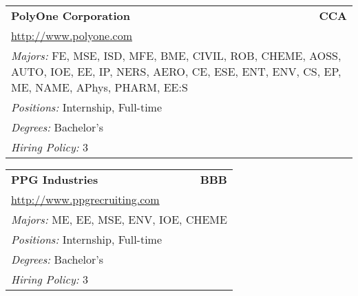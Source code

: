 \documentclass[twoside]{article}
\begin{document}
\begin{center}
\begin{multicols}{3}
\begin{FlushLeft}
\begin{minipage}{.9\columnwidth}
\end{minipage}
 
\begin{minipage}{.9\columnwidth}\begin{tabularx}{.95\columnwidth}{Xr}
                 {\Large\bf PolyOne Corporation} & {\Large\bf CCA}\\
    \multicolumn{2}{p{.95\columnwidth}}{\url{http://www.polyone.com}}\\
    \multicolumn{2}{p{.95\columnwidth}}{\emph{Majors:} FE, MSE, ISD, MFE, BME, CIVIL, ROB, CHEME, AOSS, AUTO, IOE, EE, IP, NERS, AERO, CE, ESE, ENT, ENV, CS, EP, ME, NAME, APhys, PHARM, EE:S}\\
    \multicolumn{2}{p{.95\columnwidth}}{\emph{Positions:} Internship, Full-time}\\
    \multicolumn{2}{p{.95\columnwidth}}{\emph{Degrees:} Bachelor's}\\
    \multicolumn{2}{p{.95\columnwidth}}{\emph{Hiring Policy:} 3}\\
    \end{tabularx}
    
\end{minipage}
 
\begin{minipage}{.9\columnwidth}\begin{tabularx}{.95\columnwidth}{Xr}
                 {\Large\bf PPG Industries} & {\Large\bf BBB}\\
    \multicolumn{2}{p{.95\columnwidth}}{\url{http://www.ppgrecruiting.com}}\\
    \multicolumn{2}{p{.95\columnwidth}}{\emph{Majors:} ME, EE, MSE, ENV, IOE, CHEME}\\
    \multicolumn{2}{p{.95\columnwidth}}{\emph{Positions:} Internship, Full-time}\\
    \multicolumn{2}{p{.95\columnwidth}}{\emph{Degrees:} Bachelor's}\\
    \multicolumn{2}{p{.95\columnwidth}}{\emph{Hiring Policy:} 3}\\
    \end{tabularx}
    
\end{minipage}
 

\end{FlushLeft}
\end{multicols}
\end{center}
\end{document}
